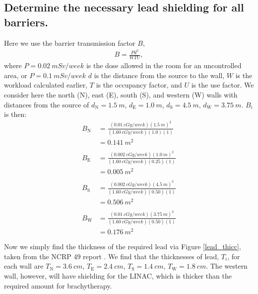 \documentclass[%
aps,
mph,%
amsmath,amssymb,
preprint,%
tightenlines,
longbibliography,
superscriptaddress,
floatfix,
nofootinbib,
]{revtex4-2}
\begin{document}
    \subsection{Determine the necessary lead shielding for all barriers.}
    Here we use the barrier transmission factor $B$,
    \begin{align}
        B = \frac{Pd^2}{WTU},
    \end{align}
    where $P = \qty{0.02}{mSv/week}$ is the dose allowed in the room for an uncontrolled area, or $P = \qty{0.1}{mSv/week}$ $d$ is the distance from the source to the wall, $W$ is the workload calculated earlier, $T$ is the occupancy factor, and $U$ is the use factor. We consider here the north (N), east (E), south (S), and western (W) walls with distances from the source of $d_\mathrm{N} = \qty{1.5}{m}$, $d_\mathrm{E} = \qty{1.0}{m}$, $d_\mathrm{S} = \qty{4.5}{m}$, $d_\mathrm{W} = \qty{3.75}{m}$. $B_i$ is then:
    \begin{align*}
        B_{\mathrm{N}} &= \frac{\left(\qty{0.01}{cGy/week}\right)\left(\qty{1.5}{m}\right)^2}{\left(\qty{1.60}{cGy/week}\right)\left(1.0\right)\left( 1 \right)}\\
        &= \qty{0.141}{m^2} \\ \\
        B_{\mathrm{E}} &= \frac{\left(\qty{0.002}{cGy/week}\right)\left(\qty{1.0}{m}\right)^2}{\left(\qty{1.60}{cGy/week}\right)\left(0.25\right)\left( 1 \right)}\\
        &= \qty{0.005}{m^2} \\ \\ 
        B_{\mathrm{S}} &= \frac{\left(\qty{0.002}{cGy/week}\right)\left(\qty{4.5}{m}\right)^2}{\left(\qty{1.60}{cGy/week}\right)\left(0.50\right)\left( 1 \right)}\\
        &= \qty{0.506}{m^2} \\ \\ 
        B_{\mathrm{W}} &= \frac{\left(\qty{0.01}{cGy/week}\right)\left(\qty{3.75}{m}\right)^2}{\left(\qty{1.60}{cGy/week}\right)\left(0.50\right)\left( 1 \right)}\\
        &= \qty{0.176}{m^2} \\ \\ 
    \end{align*}
    Now we simply find the thickness of the required lead via Figure \ref{lead_thicc}, taken from the NCRP 49 report \cite{simmons1978structural}. We find that the thicknesses of lead, $T_{i}$, for each wall are $T_\mathrm{N} = \qty{3.6}{cm}$, $T_\mathrm{E} = \qty{2.4}{cm}$, $T_\mathrm{S} = \qty{1.4}{cm}$, $T_\mathrm{W} = \qty{1.8}{cm}$. The western wall, however, will have shielding for the LINAC, which is thicker than the required amount for brachytherapy. 
\end{document}
